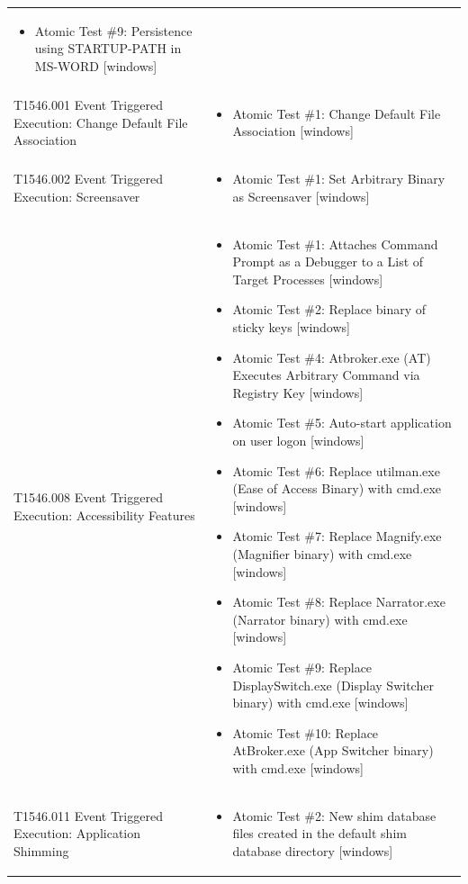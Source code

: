 \begin{longtable}{p{} p{}}
\begin{itemize}[leftmargin=*, nosep, topsep=0pt]
  \item Atomic Test \#9: Persistence using STARTUP-PATH in MS-WORD [windows]
\end{itemize} \\ [1.5ex]
T1546.001 Event Triggered Execution: Change Default File Association & \begin{itemize}[leftmargin=*, nosep, topsep=0pt]
  \item Atomic Test \#1: Change Default File Association [windows]
\end{itemize} \\ [1.5ex]
T1546.002 Event Triggered Execution: Screensaver & \begin{itemize}[leftmargin=*, nosep, topsep=0pt]
  \item Atomic Test \#1: Set Arbitrary Binary as Screensaver [windows]
\end{itemize} \\ [1.5ex]
T1546.008 Event Triggered Execution: Accessibility Features & \begin{itemize}[leftmargin=*, nosep, topsep=0pt]
  \item Atomic Test \#1: Attaches Command Prompt as a Debugger to a List of Target Processes [windows]
  \item Atomic Test \#2: Replace binary of sticky keys [windows]
  \item Atomic Test \#4: Atbroker.exe (AT) Executes Arbitrary Command via Registry Key [windows]
  \item Atomic Test \#5: Auto-start application on user logon [windows]
  \item Atomic Test \#6: Replace utilman.exe (Ease of Access Binary) with cmd.exe [windows]
  \item Atomic Test \#7: Replace Magnify.exe (Magnifier binary) with cmd.exe [windows]
  \item Atomic Test \#8: Replace Narrator.exe (Narrator binary) with cmd.exe [windows]
  \item Atomic Test \#9: Replace DisplaySwitch.exe (Display Switcher binary) with cmd.exe [windows]
  \item Atomic Test \#10: Replace AtBroker.exe (App Switcher binary) with cmd.exe [windows]
\end{itemize} \\ [1.5ex]
T1546.011 Event Triggered Execution: Application Shimming & \begin{itemize}[leftmargin=*, nosep, topsep=0pt]
  \item Atomic Test \#2: New shim database files created in the default shim database directory [windows]

\end{itemize}
\end{longtable}
